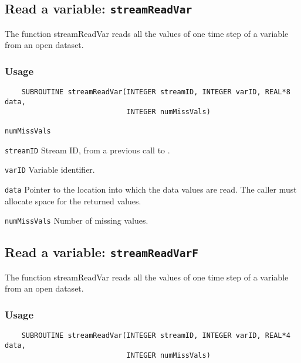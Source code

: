 

\subsection{Read a variable: \texttt{streamReadVar}}
\label{streamReadVar}

The function streamReadVar reads all the values of one time step of a variable
from an open dataset.
\subsubsection*{Usage}

\begin{verbatim}
    SUBROUTINE streamReadVar(INTEGER streamID, INTEGER varID, REAL*8 data, 
                             INTEGER numMissVals)
\end{verbatim}

\hspace*{4mm}\begin{minipage}[]{15cm}
\begin{deflist}{\texttt{numMissVals}\ }
\item[\texttt{streamID}]
Stream ID, from a previous call to {}.
\item[\texttt{varID}]
Variable identifier.
\item[\texttt{data}]
Pointer to the location into which the data values are read.
                     The caller must allocate space for the returned values.
\item[\texttt{numMissVals}]
Number of missing values.

\end{deflist}
\end{minipage}


\subsection{Read a variable: \texttt{streamReadVarF}}
\label{streamReadVarF}

The function streamReadVar reads all the values of one time step of a variable
from an open dataset.
\subsubsection*{Usage}

\begin{verbatim}
    SUBROUTINE streamReadVar(INTEGER streamID, INTEGER varID, REAL*4 data, 
                             INTEGER numMissVals)
\end{verbatim}

